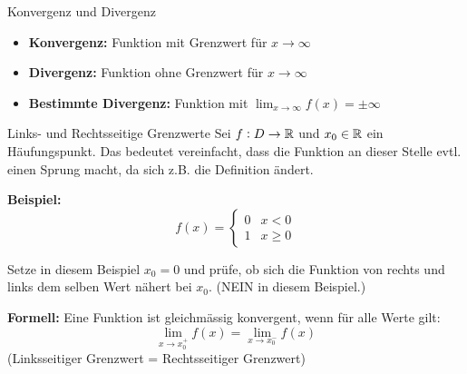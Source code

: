\begin{definition}{Konvergenz und Divergenz}
    \begin{itemize}
        \item \textbf{Konvergenz:} Funktion mit Grenzwert für $x \rightarrow \infty$
        \item \textbf{Divergenz:} Funktion ohne Grenzwert für $x \rightarrow \infty$
        \item \textbf{Bestimmte Divergenz:} Funktion mit $\lim_{x \rightarrow \infty} f(x)= \pm \infty$
    \end{itemize}
\end{definition}

\begin{definition}{Links- und Rechtsseitige Grenzwerte}
    Sei $f : D \to \mathbb{R}$ und $x_0 \in \mathbb{R}$ ein Häufungspunkt. Das bedeutet vereinfacht, dass die Funktion an dieser Stelle evtl. einen Sprung macht, da sich z.B. die Definition ändert.

    \textbf{Beispiel:}
    \begin{equation*}
        f(x) = \begin{cases}
            0 & x < 0\\
            1 & x \geq 0
        \end{cases}
    \end{equation*}

    Setze in diesem Beispiel $x_0 = 0$ und prüfe, ob sich die Funktion von rechts und links dem selben Wert nähert bei $x_0$. (NEIN in diesem Beispiel.)

    \textbf{Formell:} Eine Funktion ist gleichmässig konvergent, wenn für alle Werte gilt:
    $$\lim_{x \to x_0^+} f(x) = \lim_{x \to x_0^-} f(x)$$
    (Linksseitiger Grenzwert = Rechtsseitiger Grenzwert)
\end{definition}

